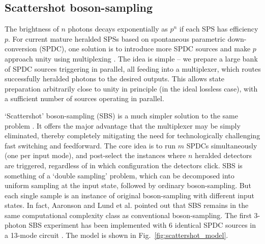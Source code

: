 \documentclass[aps,rmp,twocolumn,amsmath,amssymb,nofootinbib,superscriptaddress]{revtex4}
\begin{document}
\subsection{Scattershot boson-sampling}

The brightness of $n$ photons decays exponentially as $p^n$ if each SPS has efficiency $p$. For current mature heralded SPSs based on spontaneous parametric down-conversion (SPDC), one solution is to introduce more SPDC sources and make $p$ approach unity using multiplexing \cite{bib:34}. The idea is simple -- we prepare a large bank of SPDC sources triggering in parallel, all feeding into a multiplexer, which routes successfully heralded photons to the desired outputs. This allows state preparation arbitrarily close to unity in principle (in the ideal lossless case), with a sufficient number of sources operating in parallel.

`Scattershot' boson-sampling (SBS) is a much simpler solution to the same problem \cite{bib:35, bib:36}. It offers the major advantage that the multiplexer may be simply eliminated, thereby completely mitigating the need for technologically challenging fast switching and feedforward. The core idea is to run $m$ SPDCs simultaneously (one per input mode), and post-select the instances where $n$ heralded detectors are triggered, regardless of in which configuration the detectors click. SBS is something of a `double sampling' problem, which can be decomposed into uniform sampling at the input state, followed by ordinary boson-sampling. But each single sample is an instance of original boson-sampling with different input states. In fact, Aaronson \cite{bib:35} and Lund et al. \cite{bib:36} pointed out that SBS remains in the same computational complexity class as conventional boson-sampling. The first 3-photon SBS experiment has been implemented with 6 identical SPDC sources in a 13-mode circuit \cite{bib:38}. The model is shown in Fig.~\ref{fig:scattershot_model}.
\end{document}
